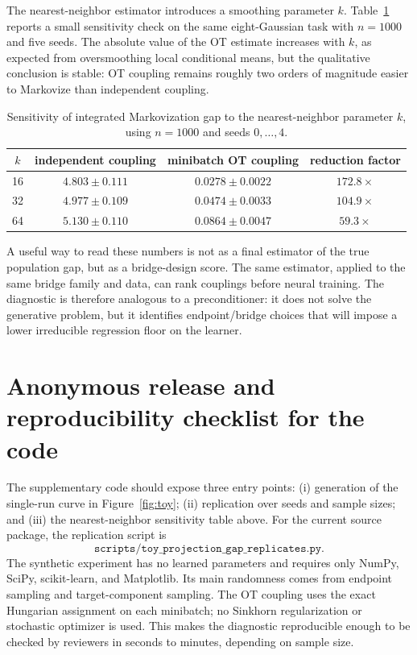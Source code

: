\documentclass{article}
\numberwithin{equation}{section}
\begin{document}
The nearest-neighbor estimator introduces a smoothing parameter \(k\). Table~\ref{tab:knn_sensitivity} reports a small sensitivity check on the same eight-Gaussian task with \(n=1000\) and five seeds. The absolute value of the OT estimate increases with \(k\), as expected from oversmoothing local conditional means, but the qualitative conclusion is stable: OT coupling remains roughly two orders of magnitude easier to Markovize than independent coupling.

\begin{table}[h]
\centering
\small
\caption{Sensitivity of integrated Markovization gap to the nearest-neighbor parameter \(k\), using \(n=1000\) and seeds \(0,\ldots,4\).}
\label{tab:knn_sensitivity}
\begin{tabular}{@{}cccc@{}}
\toprule
\(k\) & independent coupling & minibatch OT coupling & reduction factor \\
\midrule
16 & $4.803\pm0.111$ & $0.0278\pm0.0022$ & $172.8\times$ \\
32 & $4.977\pm0.109$ & $0.0474\pm0.0033$ & $104.9\times$ \\
64 & $5.130\pm0.110$ & $0.0864\pm0.0047$ & $59.3\times$ \\
\bottomrule
\end{tabular}
\end{table}

A useful way to read these numbers is not as a final estimator of the true population gap, but as a bridge-design score. The same estimator, applied to the same bridge family and data, can rank couplings before neural training. The diagnostic is therefore analogous to a preconditioner: it does not solve the generative problem, but it identifies endpoint/bridge choices that will impose a lower irreducible regression floor on the learner.

\section{Anonymous release and reproducibility checklist for the code}
\label{app:code_reproducibility}

The supplementary code should expose three entry points: (i) generation of the single-run curve in Figure~\ref{fig:toy}; (ii) replication over seeds and sample sizes; and (iii) the nearest-neighbor sensitivity table above. For the current source package, the replication script is
\begin{equation*}
    \texttt{scripts/toy\_projection\_gap\_replicates.py}.
\end{equation*}
The synthetic experiment has no learned parameters and requires only NumPy, SciPy, scikit-learn, and Matplotlib. Its main randomness comes from endpoint sampling and target-component sampling. The OT coupling uses the exact Hungarian assignment on each minibatch; no Sinkhorn regularization or stochastic optimizer is used. This makes the diagnostic reproducible enough to be checked by reviewers in seconds to minutes, depending on sample size.
\end{document}

